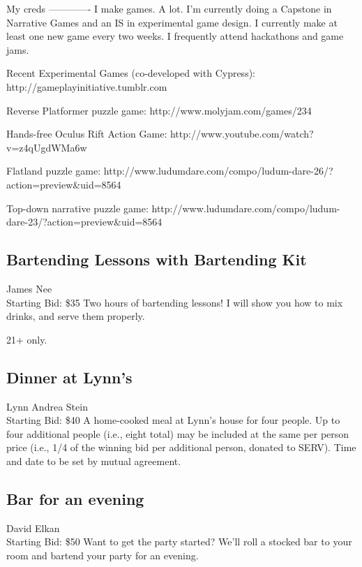 \documentclass[11pt]{article}
\begin{document}
My creds
-------------
I make games. A lot. I'm currently doing a Capstone in Narrative Games and an IS in experimental game design. I currently make at least one new game every two weeks. I frequently attend hackathons and game jams.

Recent Experimental Games (co-developed with Cypress):
http://gameplayinitiative.tumblr.com

Reverse Platformer puzzle game:
http://www.molyjam.com/games/234

Hands-free Oculus Rift Action Game:
http://www.youtube.com/watch?v=z4qUgdWMa6w

Flatland puzzle game:
http://www.ludumdare.com/compo/ludum-dare-26/?action=preview\&uid=8564

Top-down narrative puzzle game:
http://www.ludumdare.com/compo/ludum-dare-23/?action=preview\&uid=8564
\subsection{Bartending Lessons with Bartending Kit}
James Nee
\\
Starting Bid: \$35
\newline
Two hours of bartending lessons! I will show you how to mix drinks, and serve them properly.

21+ only.
\subsection{Dinner at Lynn's}
Lynn Andrea Stein
\\
Starting Bid: \$40
\newline
A home-cooked meal at Lynn's house for four people.  Up to four additional people (i.e., eight total) may be included at the same per person price (i.e., 1/4 of the winning bid per additional person, donated to SERV).  Time and date to be set by mutual agreement.
\subsection{Bar for an evening}
David Elkan
\\
Starting Bid: \$50
\newline
Want to get the party started? We'll roll a stocked bar to your room and bartend your party for an evening.
\end{document}
